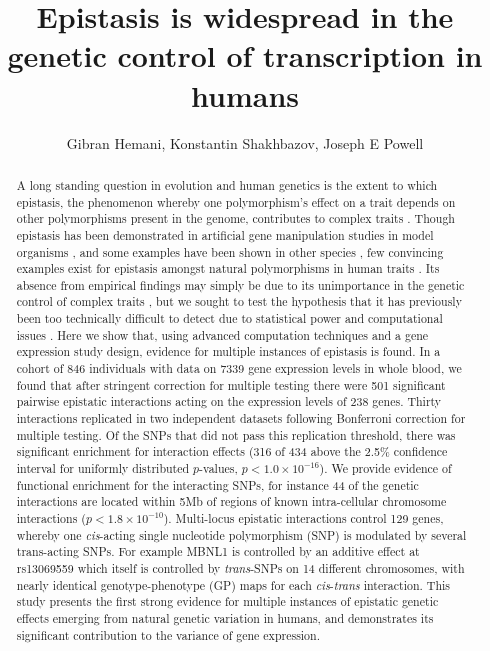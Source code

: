 \documentclass{article}
\title{Epistasis is widespread in the genetic control of transcription in humans}
\date{}
\author{Gibran Hemani, Konstantin Shakhbazov, Joseph E Powell}
\begin{document}
\maketitle


\begin{abstract}
A long standing question in evolution and human genetics is the extent to which epistasis, the phenomenon whereby one polymorphism's effect on a trait depends on other polymorphisms present in the genome, contributes to complex traits \cite{Carlborg2004, Hill2008a, Crow2010}. Though epistasis has been demonstrated in artificial gene manipulation studies in model organisms \cite{Costanzo2010, Bloom2013}, and some examples have been shown in other species \cite{Carlborg2006}, few convincing examples exist for epistasis amongst natural polymorphisms in human traits \cite{Strange2010, Evans2011}. Its absence from empirical findings may simply be due to its unimportance in the genetic control of complex traits \cite{Hill2008a, Crow2010}, but we sought to test the hypothesis that it has previously been too technically difficult to detect due to statistical power and computational issues \cite{Cordell2009}. Here we show that, using advanced computation techniques \cite{Hemani2011} and a gene expression study design, evidence for multiple instances of epistasis is found. In a cohort of 846 individuals with data on 7339 gene expression levels in whole blood, we found that after stringent correction for multiple testing there were 501 significant pairwise epistatic interactions acting on the expression levels of 238 genes. Thirty interactions replicated in two independent datasets \cite{Metspalu2004, Fehrmann2011} following Bonferroni correction for multiple testing. Of the SNPs that did not pass this replication threshold, there was significant enrichment for interaction effects (316 of 434 above the 2.5\% confidence interval for uniformly distributed $p$-values, $p < 1.0 \times 10^{-16}$). We provide evidence of functional enrichment for the interacting SNPs, for instance 44 of the genetic interactions are located within 5Mb of regions of known intra-cellular chromosome interactions \cite{Lieberman-Aiden2009} ($p < 1.8 \times 10^{-10}$). Multi-locus epistatic interactions control 129 genes, whereby one \emph{cis}-acting single nucleotide polymorphism (SNP) is modulated by several trans-acting SNPs. For example MBNL1 is controlled by an additive effect at rs13069559 which itself is controlled by \emph{trans}-SNPs on 14 different chromosomes, with nearly identical genotype-phenotype (GP) maps for each \emph{cis}-\emph{trans} interaction. This study presents the first strong evidence for multiple instances of epistatic genetic effects emerging from natural genetic variation in humans, and demonstrates its significant contribution to the variance of gene expression.
\end{abstract}
\end{document}

